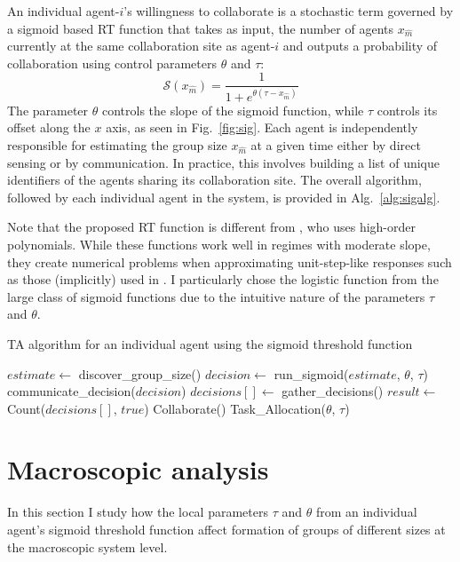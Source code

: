 \documentclass[12pt]{book}
\newcommand{\Sig}{\mathcal{S}}  %
\newcommand{\xm}{x_{\hat{m}}}
\begin{document}
An individual agent-$i$'s willingness to collaborate is a stochastic term governed by a sigmoid based RT function that takes as input, the number of agents $\xm$ currently at the same collaboration site as agent-$i$ and outputs a probability of collaboration using control parameters $\theta$ and $\tau$:
\begin{equation}
	\Sig(\xm) = \frac{1}{1+e^{\theta(\tau - \xm)}}\label{eq:sig}
\end{equation}
The parameter $\theta$ controls the slope of the sigmoid function, while $\tau$ controls its offset along the $x$ axis, as seen in Fig.~\ref{fig:sig}. Each agent is independently responsible for estimating the group size $\xm$ at a given time either by direct sensing or by communication. In practice,  this involves building a list of unique identifiers of the agents sharing its collaboration site. The overall algorithm, followed by each individual agent in the system, is provided in Alg.~\ref{alg:sigalg}.

Note that the proposed RT function is different from \cite{Bonabeau1999}, who uses high-order polynomials. While these functions work well in regimes with moderate slope, they create numerical problems when approximating unit-step-like responses such as those (implicitly) used in \cite{Lerman2001}. I particularly chose the logistic function from the large class of sigmoid functions due to the intuitive nature of the parameters $\tau$ and $\theta$. 

\begin{algorithm}
\caption{TA algorithm for an individual agent using the sigmoid threshold function}
\label{alg:sigalg}
\begin{algorithmic}
	\State $estimate \gets$ discover\_group\_size()
	\State $decision \gets$ run\_sigmoid($estimate$, $\theta$, $\tau$)
	\State communicate\_decision($decision$)
	\State $decisions[] \gets$ gather\_decisions()
	\State $result \gets$ Count($decisions[]$, $true$) 
		\State Collaborate()
		\State \Return
	\Else
		\State Task\_Allocation($\theta$, $\tau$)
	\EndIf
	\EndFunction
\end{algorithmic} 
\end{algorithm}

\section{Macroscopic analysis}\label{sec:macromodel}
In this section I study how the local parameters $\tau$ and $\theta$ from an individual agent's sigmoid threshold function affect formation of groups of different sizes at the macroscopic system level.
\end{document}
